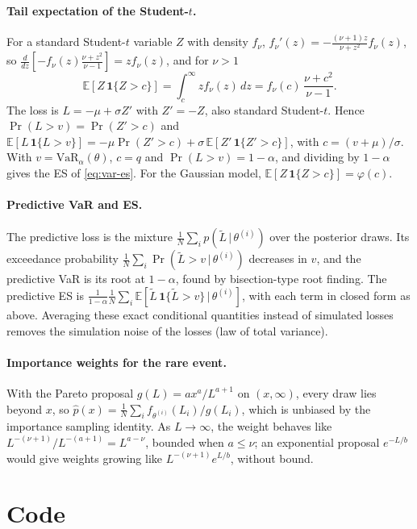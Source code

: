 \documentclass[12pt]{article}
\newcommand{\E}{\mathbb{E}}
\newcommand{\given}{\,\vert\,}
\newcommand{\VaR}{\mathrm{VaR}}
\begin{document}
\paragraph{Tail expectation of the Student-$t$.} For a standard Student-$t$ variable $Z$ with density $f_\nu$, $f_\nu'(z) = -\frac{(\nu+1)z}{\nu+z^2} f_\nu(z)$, so $\frac{d}{dz}\left[-f_\nu(z)\frac{\nu+z^2}{\nu-1}\right] = z f_\nu(z)$, and for $\nu > 1$
\[
  \E[Z\,\mathbf 1\{Z > c\}] = \int_c^\infty z f_\nu(z)\,dz = f_\nu(c)\,\frac{\nu + c^2}{\nu-1}.
\]
The loss is $L = -\mu + \sigma Z'$ with $Z' = -Z$, also standard Student-$t$. Hence $\Pr(L > v) = \Pr(Z' > c)$ and $\E[L\,\mathbf 1\{L > v\}] = -\mu\Pr(Z' > c) + \sigma\,\E[Z'\,\mathbf 1\{Z' > c\}]$, with $c = (v+\mu)/\sigma$. With $v = \VaR_\alpha(\theta)$, $c = q$ and $\Pr(L > v) = 1-\alpha$, and dividing by $1-\alpha$ gives the ES of \eqref{eq:var-es}. For the Gaussian model, $\E[Z\,\mathbf 1\{Z > c\}] = \varphi(c)$.

\paragraph{Predictive VaR and ES.} The predictive loss is the mixture $\frac1N\sum_i p(\tilde L\given\theta^{(i)})$ over the posterior draws. Its exceedance probability $\frac1N\sum_i \Pr(\tilde L > v \given \theta^{(i)})$ decreases in $v$, and the predictive VaR is its root at $1-\alpha$, found by bisection-type root finding. The predictive ES is $\frac{1}{1-\alpha}\frac1N\sum_i \E[\tilde L\,\mathbf 1\{\tilde L > v\} \given \theta^{(i)}]$, with each term in closed form as above. Averaging these exact conditional quantities instead of simulated losses removes the simulation noise of the losses (law of total variance).

\paragraph{Importance weights for the rare event.} With the Pareto proposal $g(L) = a x^a / L^{a+1}$ on $(x, \infty)$, every draw lies beyond $x$, so $\hat p(x) = \frac1N\sum_i f_{\theta^{(i)}}(L_i)/g(L_i)$, which is unbiased by the importance sampling identity. As $L \to \infty$, the weight behaves like $L^{-(\nu+1)}/L^{-(a+1)} = L^{a - \nu}$, bounded when $a \le \nu$; an exponential proposal $e^{-L/b}$ would give weights growing like $L^{-(\nu+1)} e^{L/b}$, without bound.

\section{Code}\label{app:code}
\end{document}
